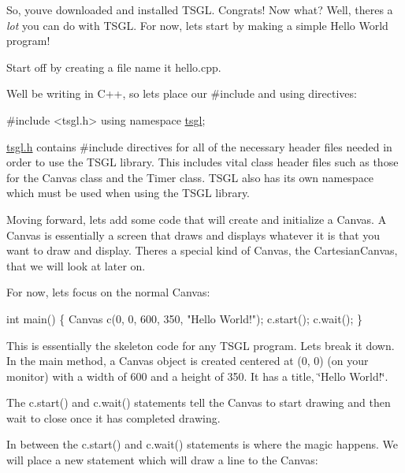 So, you\textquotesingle{}ve downloaded and installed T\+S\+G\+L. Congrats! Now what? Well, there\textquotesingle{}s a {\itshape lot} you can do with T\+S\+G\+L. For now, let\textquotesingle{}s start by making a simple Hello World program!

Start off by creating a file name it hello.\+cpp.

We\textquotesingle{}ll be writing in C++, so let\textquotesingle{}s place our \#include and using directives\+:


\begin{DoxyCode}
\textcolor{preprocessor}{#include <tsgl.h>}
\textcolor{keyword}{using namespace }\hyperlink{namespacetsgl}{tsgl};
\end{DoxyCode}


\hyperlink{tsgl_8h_source}{tsgl.\+h} contains \#include directives for all of the necessary header files needed in order to use the T\+S\+G\+L library. This includes vital class header files such as those for the Canvas class and the Timer class. T\+S\+G\+L also has its own namespace which must be used when using the T\+S\+G\+L library.

Moving forward, let\textquotesingle{}s add some code that will create and initialize a Canvas. A Canvas is essentially a screen that draws and displays whatever it is that you want to draw and display. There\textquotesingle{}s a special kind of Canvas, the Cartesian\+Canvas, that we will look at later on.

For now, let\textquotesingle{}s focus on the normal Canvas\+:


\begin{DoxyCode}
\textcolor{keywordtype}{int} main() \{
  Canvas c(0, 0, 600, 350, \textcolor{stringliteral}{"Hello World!"});
  c.start();
  c.wait();
\}
\end{DoxyCode}


This is essentially the skeleton code for any T\+S\+G\+L program. Let\textquotesingle{}s break it down. In the main method, a Canvas object is created centered at (0, 0) (on your monitor) with a width of 600 and a height of 350. It has a title, \char`\"{}\+Hello World!\char`\"{}.

The c.\+start() and c.\+wait() statements tell the Canvas to start drawing and then wait to close once it has completed drawing.

In between the c.\+start() and c.\+wait() statements is where the magic happens. We will place a new statement which will draw a line to the Canvas\+:


